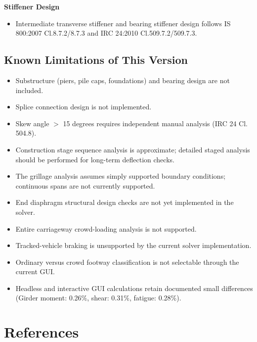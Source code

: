 \documentclass[12pt,a4paper]{report}
\numberwithin{table}{chapter}
\numberwithin{figure}{chapter}
\begin{document}
\textbf{Stiffener Design}

\begin{itemize}
\item Intermediate transverse stiffener and bearing stiffener design follows IS 800:2007 Cl.8.7.2/8.7.3 and IRC 24:2010 Cl.509.7.2/509.7.3.
\end{itemize}


\section{Known Limitations of This Version}
\label{sec:limitations}

\begin{itemize}
\item Substructure (piers, pile caps, foundations) and bearing design are not included.
\item Splice connection design is not implemented.
\item Skew angle $>$ 15 degrees requires independent manual analysis (IRC 24 Cl. 504.8).
\item Construction stage sequence analysis is approximate; detailed staged analysis
  should be performed for long-term deflection checks.
\item The grillage analysis assumes simply supported boundary conditions;
  continuous spans are not currently supported.
\item End diaphragm structural design checks are not yet implemented in the solver.
\item Entire carriageway crowd-loading analysis is not supported.
\item Tracked-vehicle braking is unsupported by the current solver implementation.
\item Ordinary versus crowd footway classification is not selectable through the current GUI.
\item Headless and interactive GUI calculations retain documented small differences
  (Girder moment: 0.26\%, shear: 0.31\%, fatigue: 0.28\%).
\end{itemize}


\chapter*{References}
\end{document}
